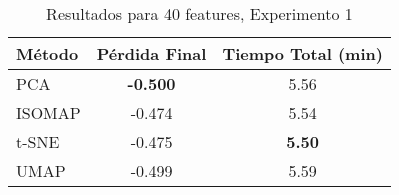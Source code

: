 
\begin{table}[h]
\centering
\begin{tabular}{lcc}
\toprule
\textbf{Método} & \textbf{Pérdida Final} & \textbf{Tiempo Total (min)} \\
\midrule
PCA & \textbf{-0.500} & 5.56 \\
ISOMAP & -0.474 & 5.54 \\
t-SNE & -0.475 & \textbf{5.50} \\
UMAP & -0.499 & 5.59 \\
\bottomrule
\end{tabular}
\caption{Resultados para 40 features, Experimento 1}
\label{tab:results_40feat_exp1}
\end{table}
